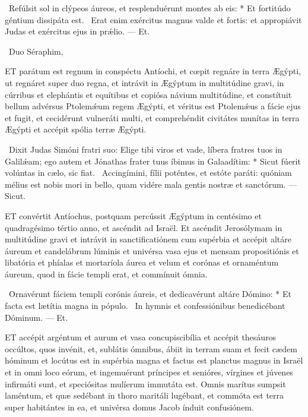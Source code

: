 \R\ Refúlsit sol in clýpeos áureos, et resplenduérunt montes ab eis: * Et fortitúdo géntium dissipáta est. \V\ Erat enim exércitus magnus valde et fortis: et appropiávit Judas et exércitus ejus in prǽlio. — Et.

\R\ Duo Séraphim, 





\lettrine[lines=2]{E}{T} parátum est regnum in conspéctu Antíochi, et cœpit regnáre in terra Ægýpti, ut regnáret super duo regna, et intrávit in Ægýptum in multitúdine gravi, in cúrribus et elephántis et equítibus et copiósa návium multitúdine, et constítuit bellum advérsus Ptolemǽum regem Ægýpti, et véritus est Ptolemǽus a fácie ejus et fugit, et cecidérunt vulneráti multi, et comprehéndit civitátes munítas in terra Ægýpti et accépit spólia terræ Ægýpti.

\R\ Dixit Judas Simóni fratri suo: Elige tibi viros et vade, líbera fratres tuos in Galilǽam; ego autem et Jónathas frater tuus íbimus in Galaadítim: * Sicut fúerit volúntas in cælo, sic fiat. \V\ Accingímini, fílii poténtes, et estóte paráti: quóniam mélius est nobis mori in bello, quam vidére mala gentis nostræ et sanctórum. — Sicut.


\lettrine[lines=2]{E}{T} convértit Antíochus, postquam percússit Ægýptum in centésimo et quadragésimo tértio anno, et ascéndit ad Israël. Et ascéndit Jerosólymam in multitúdine gravi et intrávit in sanctificatiónem cum supérbia et accépit altáre áureum et candelábrum lúminis et univérsa vasa ejus et mensam propositiónis et libatória et phíalas et mortaríola áurea et velum et corónas et ornaméntum áureum, quod in fácie templi erat, et commínuit ómnia.

\R\ Ornavérunt fáciem templi corónis áureis, et dedicavérunt altáre Dómino: * Et facta est lætítia magna in pópulo. \V\ In hymnis et confessiónibus benedicébant Dóminum. — Et.



\lettrine[lines=2]{E}{T} accépit argéntum et aurum et vasa concupiscibília et accépit thesáuros occúltos, quos invénit, et, sublátis ómnibus, ábiit in terram suam et fecit cædem hóminum et locútus est in supérbia magna et factus est planctus magnus in Israël et in omni loco eórum, et ingemuérunt príncipes et senióres, vírgines et júvenes infirmáti sunt, et speciósitas mulíerum immutáta est. Omnis marítus sumpsit laméntum, et quæ sedébant in thoro maritáli lugébant, et commóta est terra super habitántes in ea, et univérsa domus Jacob índuit confusiónem.

